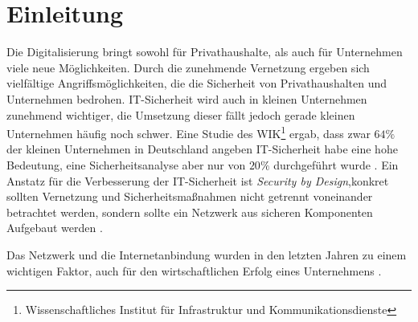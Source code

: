 \chapter{Einleitung}

Die Digitalisierung bringt sowohl für Privathaushalte, als auch für Unternehmen viele neue Möglichkeiten. Durch die zunehmende Vernetzung ergeben sich vielfältige Angriffsmöglichkeiten, die die Sicherheit von Privathaushalten und Unternehmen bedrohen. IT-Sicherheit wird auch in kleinen Unternehmen zunehmend wichtiger, die Umsetzung dieser fällt jedoch gerade kleinen Unternehmen häufig noch schwer. Eine Studie des WIK\footnote{Wissenschaftliches Institut für Infrastruktur und Kommunikationsdienste} ergab, dass zwar $64\%$ der kleinen Unternehmen in Deutschland angeben IT-Sicherheit habe eine hohe Bedeutung, eine Sicherheitsanalyse aber nur von $20\%$ durchgeführt wurde \cite{wik2017KMU}.   
Ein Anstatz für die Verbesserung der IT-Sicherheit ist \emph{Security by Design},konkret sollten Vernetzung und Sicherheitsmaßnahmen nicht getrennt voneinander betrachtet werden, sondern sollte ein Netzwerk aus sicheren Komponenten Aufgebaut werden \cite{nicholson2018blurring}.

Das Netzwerk und die Internetanbindung wurden in den letzten Jahren zu einem wichtigen Faktor, auch für den wirtschaftlichen Erfolg eines Unternehmens \cite{lipp2007vpn}.